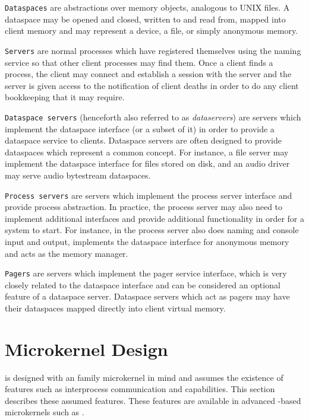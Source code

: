 \texttt{Dataspaces} are abstractions over memory objects, analogous to UNIX files. A dataspace may be opened and closed, written to and read from, mapped into client memory and may represent a device, a file, or simply anonymous memory.

\texttt{Servers} are normal processes which have registered themselves using the naming service so that other client processes may find them. Once a client finds a process, the client may connect and establish a session with the server and the server is given access to the notification of client deaths in order to do any client bookkeeping that it may require.

\texttt{Dataspace servers} (henceforth also referred to as \emph{dataservers}) are servers which implement the dataspace interface (or a subset of it) in order to provide a dataspace service to clients. Dataspace servers are often designed to provide dataspaces which represent a common concept. For instance, a file server may implement the dataspace interface for files stored on disk, and an audio driver may serve audio bytestream dataspaces.

\texttt{Process servers} are servers which implement the process server interface and provide process abstraction. In practice, the process server may also need to implement additional interfaces and provide additional functionality in order for a system to start. For instance, in  the process server also does naming and console input and output, implements the dataspace interface for anonymous memory and acts as the memory manager.

\texttt{Pagers} are servers which implement the pager service interface, which is very closely related to the dataspace interface and can be considered an optional feature of a dataspace server. Dataspace servers which act as pagers may have their dataspaces mapped directly into client virtual memory.

\section{Microkernel Design}

 is designed with an \Lf family microkernel in mind and assumes the existence of features such as interprocess communication and capabilities. This section describes these assumed features. These features are available in advanced \Lf-based microkernels such as \seLf.

